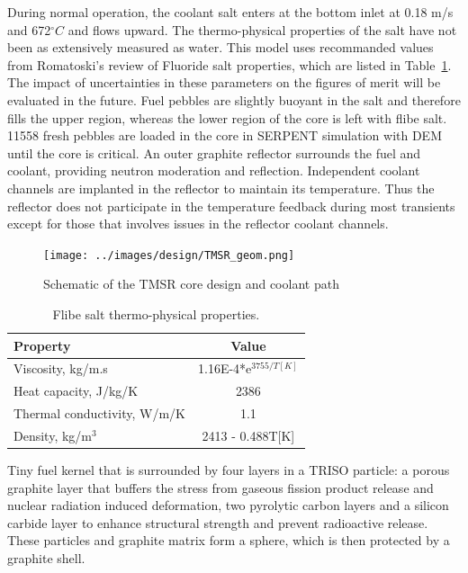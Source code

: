 \documentclass{elsarticle}
\begin{document}
During normal operation, the coolant salt enters at the bottom inlet at 0.18 m/s and 672$^{\circ}C$ and flows upward. The thermo-physical properties of the salt have not been as extensively measured as water. This model uses recommanded values from Romatoski's review of Fluoride salt properties\cite{Romatoski2017a}, which are listed in Table~\ref{tab:flibe}. The impact of uncertainties in these parameters on the figures of merit will be evaluated in the future.
Fuel pebbles are slightly buoyant in the salt and therefore fills the upper region, whereas the lower region of the core is left with flibe salt. 11558 fresh pebbles are loaded in the core in SERPENT simulation with DEM until the core is critical. An outer graphite reflector surrounds the fuel and coolant, providing neutron moderation and reflection. Independent coolant channels are implanted in the reflector to maintain its temperature. Thus the reflector does not participate in the temperature feedback during most transients except for those that involves issues in the reflector coolant channels.

\begin{figure}[h]
    \centering
    \texttt{[image: ../images/design/TMSR\_geom.png]}
    \caption{Schematic of the TMSR core design and coolant path}
    \label{fig:TMSR}
\end{figure}


\begin{table}
  \caption{Flibe salt thermo-physical properties.}
  \begin{tabular}[h]{lc}
    \hline
    Property & Value\\
    \hline
    Viscosity, kg/m.s & 1.16E-4*e$^{3755/T[K]}$\\
    Heat capacity, J/kg/K & 2386\\
    Thermal conductivity, W/m/K & 1.1\\
    Density, kg/m$^3$ & 2413 - 0.488T[K]\\
    \hline
  \end{tabular}
\label{tab:flibe}
\end{table}

Tiny fuel kernel that is surrounded by four layers in a TRISO particle: a porous graphite layer that buffers the stress from gaseous fission product release and nuclear radiation induced deformation, two pyrolytic carbon layers and a silicon carbide layer to enhance structural strength and prevent radioactive release.  These particles and graphite matrix form a sphere, which is then protected by a graphite shell. 
\end{document}
